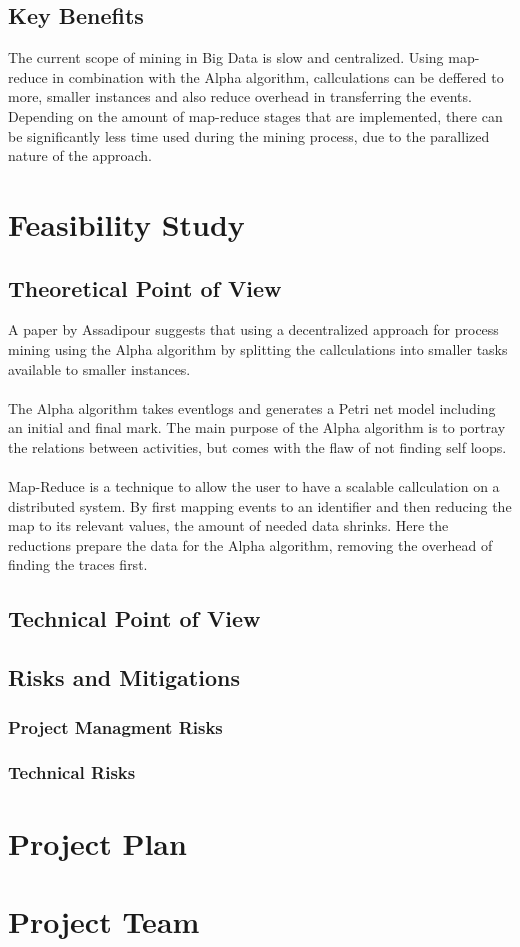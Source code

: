 \documentclass[runningheads]{llncs}
\begin{document}
\subsection{Key Benefits}
The current scope of mining in Big Data is slow and centralized. Using map-reduce in combination with the Alpha algorithm, callculations can be deffered to more, smaller instances and also reduce overhead in transferring the events. Depending on the amount of  map-reduce stages that are implemented, there can be significantly less time used during the mining process, due to the parallized nature of the approach. \cite{mapReduce}
\section{Feasibility Study}

\subsection{Theoretical Point of View}
A paper by Assadipour\cite{mapReduce} suggests that using a decentralized approach for process mining using the Alpha algorithm by splitting the callculations into smaller tasks available to smaller instances. \\ \ \\
The Alpha algorithm takes eventlogs and generates a Petri net model including an initial and final mark. The main purpose of the Alpha algorithm is to portray the relations between activities, but comes with the flaw of not finding self loops.  \\ \ \\
Map-Reduce is a technique to allow the user to have a scalable callculation on a distributed system. By first mapping events to an identifier and then reducing the map to its relevant values, the amount of needed data shrinks. Here the reductions prepare the data for the Alpha algorithm, removing the overhead of finding the traces first.
\subsection{Technical Point of View}
\subsection{Risks and Mitigations}

	\subsubsection{Project Managment Risks}
	\subsubsection{Technical Risks}

\section{Project Plan}
\section{Project Team}





\end{document}
